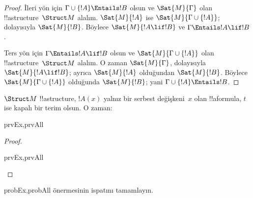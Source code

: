 \documentclass[../../../include/open-logic-section]{subfiles}
\begin{document}
\begin{proof}
İleri yön için $\Gamma\cup\{!A\}\Entails !B$ olsun ve
$\Sat{M}{\Gamma}$ olan !!a{structure}~$\Struct M$ alalım.
$\Sat{M}{!A}$ ise $\Sat{M}{\Gamma\cup\{!A\}}$; dolayısıyla
$\Sat{M}{!B}$. Böylece $\Sat{M}{!A\lif !B}$ ve
$\Gamma\Entails !A\lif !B$.

Ters yön için $\Gamma\Entails !A\lif !B$ olsun ve
$\Sat{M}{\Gamma\cup\{!A\}}$ olan !!a{structure}~$\Struct M$ alalım.
O zaman $\Sat{M}{\Gamma}$, dolayısıyla $\Sat{M}{!A\lif !B}$; ayrıca
$\Sat{M}{!A}$ olduğundan $\Sat{M}{!B}$. Böylece
$\Sat{M}{\Gamma\cup\{!A\}}$ olduğunda $\Sat{M}{!B}$; yani
$\Gamma\cup\{!A\}\Entails !B$.
\end{proof}

\begin{prop}
  $\Struct M$ !!a{structure}, $!A(x)$ yalnız bir serbest değişkeni~$x$
  olan !!a{formula}, $t$ ise kapalı bir terim olsun. O zaman:
  \begin{tagenumerate}{prvEx,prvAll}
  \end{tagenumerate}
\end{prop}

\begin{proof}
  \begin{tagenumerate}{prvEx,prvAll}
  \end{tagenumerate}
\end{proof}

\begin{probtag}{probEx,probAll}
   önermesinin ispatını
  tamamlayın.
\end{probtag}
\end{document}
